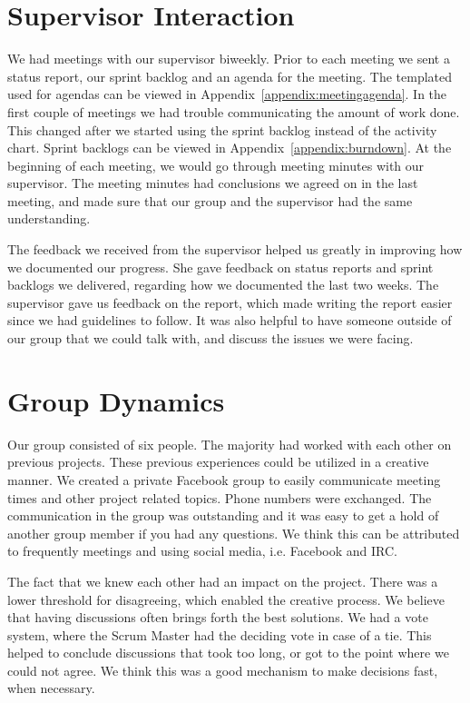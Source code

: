 \pagebreak
\section{Supervisor Interaction}

We had meetings with our supervisor biweekly. Prior to each meeting we
sent a status report, our sprint backlog and an agenda for the meeting.
The templated used for agendas can be viewed in Appendix~\ref{appendix:meetingagenda}. In the
first couple of meetings we had trouble communicating the amount of
work done. This changed after we started using the sprint backlog
instead of the activity chart. Sprint backlogs can be viewed in Appendix~\ref{appendix:burndown}. At
the beginning of each meeting, we would go through meeting minutes with
our supervisor. The meeting minutes had conclusions we agreed on in the
last meeting, and made sure that our group and the supervisor had the
same understanding. \ 

The feedback we received from the supervisor helped us greatly in
improving how we documented our progress. She gave feedback on status
reports and sprint backlogs we delivered, regarding how we documented
the last two weeks. The supervisor gave us feedback on the report,
which made writing the report easier since we had guidelines to follow.
It was also helpful to have someone outside of our group that we could
talk with, and discuss the issues we were facing.

\section{Group Dynamics}

Our group consisted of six people. The majority had worked with each
other on previous projects. These previous experiences could be
utilized in a creative manner. We created a private Facebook group to
easily communicate meeting times and other project related topics.
Phone numbers were exchanged. The communication in the group was
outstanding and it was easy to get a hold of another group member if
you had any questions. We think this can be attributed to frequently
meetings and using social media, i.e. Facebook and IRC.

The fact that we knew each other had an impact on the project. There was
a lower threshold for disagreeing, which enabled the creative process.
We believe that having discussions often brings forth the best
solutions. We had a vote system, where the Scrum Master had the
deciding vote in case of a tie. This helped to conclude discussions
that took too long, or got to the point where we could not agree. We
think this was a good mechanism to make decisions fast, when necessary.


